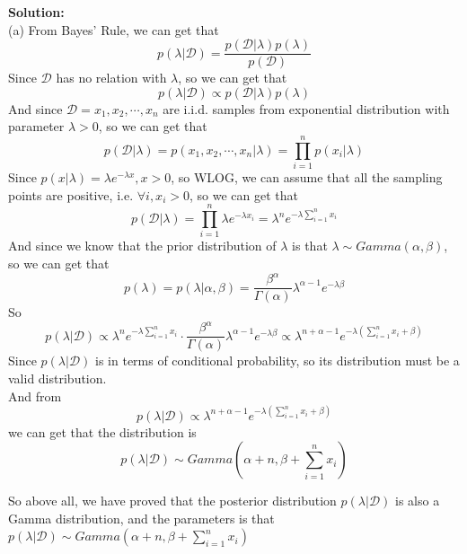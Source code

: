 \documentclass[10pt]{article}
\begin{document}
\begin{enumerate}[1.]
      	  \textbf{Solution:}\\
		  (a) From Bayes' Rule, we can get that
		  $$p(\lambda|\mathcal{D})=\dfrac{p(\mathcal{D}|\lambda)p(\lambda)}{p(\mathcal{D})}$$
		  Since $\mathcal{D}$ has no relation with $\lambda$, so we can get that
		  $$p(\lambda|\mathcal{D})\propto p(\mathcal{D}|\lambda)p(\lambda)$$
		  And since $\mathcal{D}={x_1,x_2,\cdots,x_n}$ are i.i.d. samples from exponential distribution with parameter $\lambda > 0$, so we can get that
		  $$p(\mathcal{D}|\lambda)=p(x_1,x_2,\cdots,x_n|\lambda)=\prod\limits_{i=1}^np(x_i|\lambda)$$
		  Since $p(x|\lambda)=\lambda e^{-\lambda x},x>0$, so WLOG, we can assume that all the sampling points are positive,
		  i.e. $\forall i, x_i>0$, so we can get that
		  $$p(\mathcal{D}|\lambda)=\prod\limits_{i=1}^n\lambda e^{-\lambda x_i}=\lambda^n e^{-\lambda\sum\limits_{i=1}^nx_i}$$
		  And since we know that the prior distribution of $\lambda$ is that $\lambda\sim Gamma(\alpha,\beta)$,
		  so we can get that
		  $$p(\lambda)=p(\lambda|\alpha,\beta)=\dfrac{\beta^{\alpha}}{\Gamma(\alpha)} \lambda^{\alpha-1}e^{-\lambda\beta}$$
		  So
		  $$p(\lambda|\mathcal{D})\propto \lambda^n e^{-\lambda\sum\limits_{i=1}^nx_i}\cdot\dfrac{\beta^{\alpha}}{\Gamma(\alpha)} \lambda^{\alpha-1}e^{-\lambda\beta}\propto\lambda^{n+\alpha-1}e^{-\lambda(\sum\limits_{i=1}^nx_i+\beta)}$$
		  Since $p(\lambda|\mathcal{D})$ is in terms of conditional probability, so its distribution must be a valid distribution.\\
		  And from $$p(\lambda|\mathcal{D})\propto\lambda^{n+\alpha-1}e^{-\lambda(\sum\limits_{i=1}^nx_i+\beta)}$$
		  we can get that the distribution is $$p(\lambda|\mathcal{D})\sim Gamma(\alpha+n,\beta+\sum\limits_{i=1}^nx_i)$$

		  So above all, we have proved that the posterior distribution $p(\lambda|\mathcal{D})$ is also a Gamma distribution, 
		  and the parameters is that $p(\lambda|\mathcal{D})\sim Gamma(\alpha+n,\beta+\sum\limits_{i=1}^nx_i)$


\end{enumerate}
\end{document}
